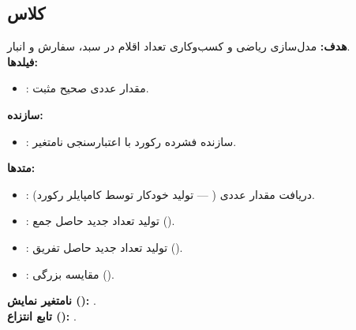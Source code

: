 \documentclass[11pt,a4paper]{article}
\begin{document}
\subsection{کلاس  }
\textbf{هدف:} مدل‌سازی ریاضی و کسب‌وکاری تعداد اقلام در سبد، سفارش و انبار.\\
\textbf{فیلدها:}
\begin{itemize}
    \item {}: مقدار عددی صحیح مثبت.
\end{itemize}
\textbf{سازنده:}
\begin{itemize}
    \item {}: سازنده فشرده رکورد با اعتبارسنجی نامتغیر.
\end{itemize}
\textbf{متدها:}
\begin{itemize}
    \item {}: دریافت مقدار عددی ( --- تولید خودکار توسط کامپایلر رکورد).
    \item {}: تولید تعداد جدید حاصل جمع ().
    \item {}: تولید تعداد جدید حاصل تفریق ().
    \item {}: مقایسه بزرگی ().
\end{itemize}
\textbf{نامتغیر نمایش ():} .\\
\textbf{تابع انتزاع ():} .
\end{document}

